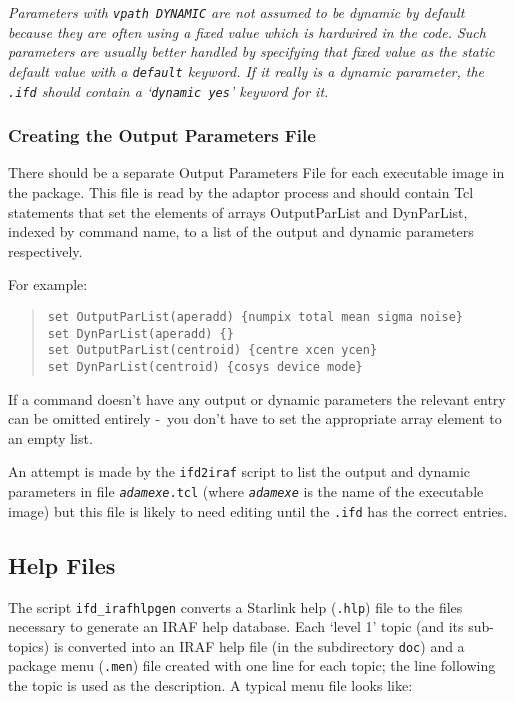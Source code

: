 \documentclass[twoside,11pt]{article}
\newcommand{\xref}[3]{#1}
\newcommand{\xlabel}[1]{}
\newcommand{\itfile}[2]{\texttt{\textit{#1}#2}}
\newcommand{\dash}{--}
\renewcommand{\dash}{-}
\begin{document}
\emph{Parameters with \texttt{vpath DYNAMIC} are not assumed to be dynamic by 
default because they are often using a fixed value which is hardwired in the
code. Such parameters are usually better handled by specifying that fixed 
value as the static default value with a
\xref{\texttt{default}}{ssn68}{default}
keyword.
If it really is a dynamic parameter, the \texttt{.ifd} should contain a 
\xref{`\texttt{dynamic yes}'}{ssn68}{dynamic}
keyword for it.}

\subsubsection{\xlabel{creating_the_output_parameters_file}Creating the Output Parameters File}
There should be a separate Output Parameters File for each executable image in
the package.
This file is read by the adaptor process and should contain Tcl statements that 
set the elements of arrays OutputParList and DynParList, indexed by command 
name, to a list of the output and dynamic parameters respectively.

For example:
\begin{quote} \begin{verbatim}
set OutputParList(aperadd) {numpix total mean sigma noise}
set DynParList(aperadd) {}
set OutputParList(centroid) {centre xcen ycen}
set DynParList(centroid) {cosys device mode}
\end{verbatim} \end{quote}

If a command doesn't have any output or dynamic parameters the relevant entry
can be omitted entirely \dash\ you don't have to set the appropriate array 
element to an empty list.

An attempt is made by the 
\xref{\texttt{ifd2iraf}}{ssn68}{producing_iraf_files_from_an_ifd} 
script to list the output and dynamic parameters in file \itfile{adamexe}{.tcl}
(where \texttt{\textit{adamexe}} is the name of the executable image) but 
this file is likely to need editing until the \texttt{.ifd} has the correct 
entries.

\subsection{\xlabel{help_files}Help Files}
The script \texttt{ifd\_irafhlpgen} converts a Starlink help (\texttt{.hlp})
file to the files necessary to generate an IRAF help database. Each `level 1'
topic (and its sub-topics) is converted into an IRAF help file (in the
subdirectory \texttt{doc}) and a package menu (\texttt{.men}) file created
with one line for each topic; the line following the topic is used
as the description. A typical menu file looks like:
\end{document}

